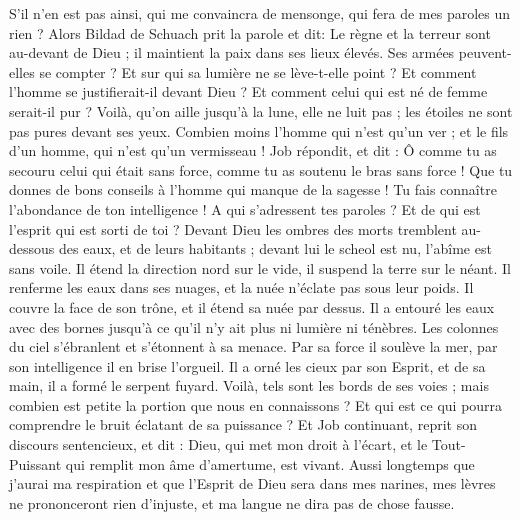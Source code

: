 \begin{multicols}{2}
S'il n'en est pas ainsi, qui me convaincra de mensonge, qui fera de mes paroles un rien ?
\VerseOne{}Alors Bildad de Schuach prit la parole et dit: 
Le règne et la terreur sont au-devant de Dieu ; il maintient la paix dans ses lieux élevés.
 Ses armées peuvent-elles se compter ? Et sur qui sa lumière ne se lève-t-elle point ?
Et comment l'homme se justifierait-il devant Dieu ? Et comment celui qui est né de femme serait-il pur ?
Voilà, qu'on aille jusqu'à la lune, elle ne luit pas ; les étoiles ne sont pas pures devant ses yeux.
Combien moins l'homme qui n'est qu'un ver ; et le fils d'un homme, qui n'est qu'un vermisseau  !
\VerseOne{}Job répondit, et dit :
Ô comme tu as secouru celui qui était sans force, comme tu as soutenu le bras sans force !
Que tu donnes de bons conseils à l'homme qui manque de la sagesse ! Tu fais connaître l'abondance de ton intelligence !
A qui s'adressent tes paroles ? Et de qui est l'esprit qui est sorti de toi ?
Devant Dieu les ombres des morts tremblent au-dessous des eaux, et de leurs habitants ;
devant lui le scheol est nu, l'abîme est sans voile.
Il étend la direction nord sur le vide, il suspend la terre sur le néant.
Il renferme les eaux dans ses nuages, et la nuée n'éclate pas sous leur poids.
Il couvre la face de son trône, et il étend sa nuée par dessus.
Il a entouré les eaux avec des bornes jusqu'à ce qu'il n'y ait plus ni lumière ni ténèbres.
Les colonnes du ciel s'ébranlent et s'étonnent à sa menace.
Par sa force il soulève la mer, par son intelligence il en brise l'orgueil.
Il a orné les cieux par son Esprit, et de sa main, il a formé le serpent fuyard.
Voilà, tels sont les bords de ses voies ; mais combien est petite la portion que nous en connaissons ? Et qui est ce qui pourra comprendre le bruit éclatant de sa puissance ?
\VerseOne{}Et Job continuant, reprit son discours sentencieux, et dit :
Dieu, qui met mon droit à l'écart, et le Tout-Puissant qui remplit mon âme d'amertume, est vivant.
Aussi longtemps que j'aurai ma respiration et que l'Esprit de Dieu sera dans mes narines,
mes lèvres ne prononceront rien d'injuste, et ma langue ne dira pas de chose fausse.

\end{multicols}
